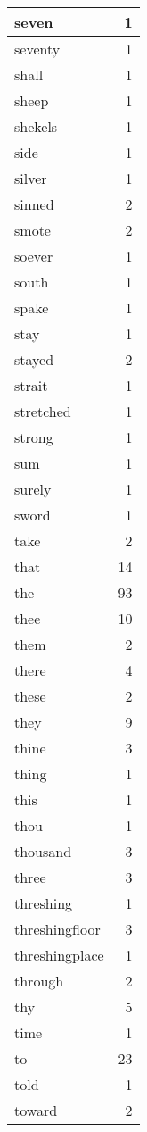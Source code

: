 \begin{center}
\begin{longtable}{l|r}
seven & 1 \\ \hline
seventy & 1 \\ \hline
shall & 1 \\ \hline
sheep & 1 \\ \hline
shekels & 1 \\ \hline
side & 1 \\ \hline
silver & 1 \\ \hline
sinned & 2 \\ \hline
smote & 2 \\ \hline
soever & 1 \\ \hline
south & 1 \\ \hline
spake & 1 \\ \hline
stay & 1 \\ \hline
stayed & 2 \\ \hline
strait & 1 \\ \hline
stretched & 1 \\ \hline
strong & 1 \\ \hline
sum & 1 \\ \hline
surely & 1 \\ \hline
sword & 1 \\ \hline
take & 2 \\ \hline
that & 14 \\ \hline
the & 93 \\ \hline
thee & 10 \\ \hline
them & 2 \\ \hline
there & 4 \\ \hline
these & 2 \\ \hline
they & 9 \\ \hline
thine & 3 \\ \hline
thing & 1 \\ \hline
this & 1 \\ \hline
thou & 1 \\ \hline
thousand & 3 \\ \hline
three & 3 \\ \hline
threshing & 1 \\ \hline
threshingfloor & 3 \\ \hline
threshingplace & 1 \\ \hline
through & 2 \\ \hline
thy & 5 \\ \hline
time & 1 \\ \hline
to & 23 \\ \hline
told & 1 \\ \hline
toward & 2 \\ \hline

\end{longtable}
\end{center}
